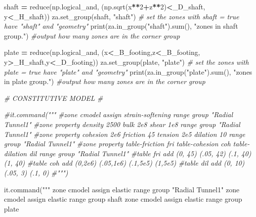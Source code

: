 \documentclass[a4paper, nobind]{templates/ociamthesis}
\newenvironment{Shaded}{\begin{snugshade}}{\end{snugshade}}
\newcommand{\BuiltInTok}[1]{#1}
\newcommand{\CommentTok}[1]{\textcolor[rgb]{0.56,0.35,0.01}{\textit{#1}}}
\newcommand{\DecValTok}[1]{\textcolor[rgb]{0.00,0.00,0.81}{#1}}
\newcommand{\NormalTok}[1]{#1}
\newcommand{\OperatorTok}[1]{\textcolor[rgb]{0.81,0.36,0.00}{\textbf{#1}}}
\newcommand{\StringTok}[1]{\textcolor[rgb]{0.31,0.60,0.02}{#1}}
\renewenvironment{Shaded}
{
  \vspace{10pt}%
  \begin{snugshade}%
}{%
  \end{snugshade}%
  \vspace{8pt}%
}
\begin{document}
\begin{Shaded}
\begin{Highlighting}[]
\NormalTok{shaft }\OperatorTok{=} \BuiltInTok{reduce}\NormalTok{(np.logical\_and, (np.sqrt(x}\OperatorTok{**}\DecValTok{2}\OperatorTok{+}\NormalTok{z}\OperatorTok{**}\DecValTok{2}\NormalTok{)}\OperatorTok{\textless{}}\NormalTok{\_D\_shaft, y}\OperatorTok{\textless{}}\NormalTok{\_H\_shaft))}
\NormalTok{za.set\_group(shaft, }\StringTok{"shaft"}\NormalTok{) }\CommentTok{\# set the zones with shaft = true have "shaft" and "geometry"}
\BuiltInTok{print}\NormalTok{(za.in\_group(}\StringTok{"shaft"}\NormalTok{).}\BuiltInTok{sum}\NormalTok{(), }\StringTok{"zones in shaft group."}\NormalTok{) }\CommentTok{\#output how many zones are in the corner group}

\NormalTok{plate }\OperatorTok{=} \BuiltInTok{reduce}\NormalTok{(np.logical\_and, (x}\OperatorTok{\textless{}}\NormalTok{\_B\_footing,z}\OperatorTok{\textless{}}\NormalTok{\_B\_footing, y}\OperatorTok{\textgreater{}}\NormalTok{\_H\_shaft,y}\OperatorTok{\textless{}}\NormalTok{\_D\_footing))}
\NormalTok{za.set\_group(plate, }\StringTok{"plate"}\NormalTok{) }\CommentTok{\# set the zones with plate = true have "plate" and "geometry"}
\BuiltInTok{print}\NormalTok{(za.in\_group(}\StringTok{"plate"}\NormalTok{).}\BuiltInTok{sum}\NormalTok{(), }\StringTok{"zones in plate group."}\NormalTok{) }\CommentTok{\#output how many zones are in the corner group}

\CommentTok{\# CONSTITUTIVE MODEL \#}

\CommentTok{\#it.command("""}
\CommentTok{\#zone cmodel assign strain{-}softening range group "Radial Tunnel1"}
\CommentTok{\#zone property density 2500 bulk 2e8 shear 1e8 range group "Radial Tunnel1"}
\CommentTok{\#zone property cohesion 2e6 friction 45 tension 2e5 dilation 10 range group "Radial Tunnel1"}
\CommentTok{\#zone property table{-}friction \textquotesingle{}fri\textquotesingle{} table{-}cohesion \textquotesingle{}coh\textquotesingle{} table{-}dilation \textquotesingle{}dil\textquotesingle{} range group "Radial Tunnel1"}
\CommentTok{\#table \textquotesingle{}fri\textquotesingle{} add (0, 45) (.05, 42) (.1, 40) (1, 40)}
\CommentTok{\#table \textquotesingle{}coh\textquotesingle{} add (0,2e6) (.05,1e6) (.1,5e5) (1,5e5) }
\CommentTok{\#table \textquotesingle{}dil\textquotesingle{} add (0, 10) (.05,  3) (.1,  0)}
\CommentTok{\#""")}

\NormalTok{it.command(}\StringTok{"""}
\StringTok{zone cmodel assign elastic range group "Radial Tunnel1"}
\StringTok{zone cmodel assign elastic range group \textquotesingle{}shaft\textquotesingle{}}
\StringTok{zone cmodel assign elastic range group \textquotesingle{}plate\textquotesingle{}}


\end{Highlighting}
\end{Shaded}
\end{document}
